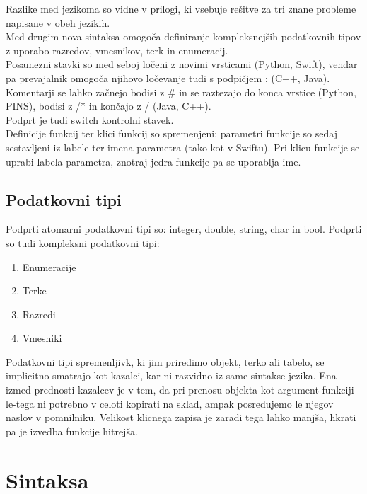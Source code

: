 \documentclass[a4paper, 12p]{book}
\begin{document}
\noindent Razlike med jezikoma so vidne v prilogi, ki vsebuje rešitve za tri znane probleme napisane v obeh jezikih. \\
\indent Med drugim nova sintaksa omogoča definiranje kompleksnejših podatkovnih tipov z uporabo razredov, vmesnikov, terk in enumeracij. \\
\indent Posamezni stavki so med seboj ločeni z novimi vrsticami (Python, Swift), vendar pa prevajalnik omogoča njihovo ločevanje tudi s podpičjem {\ttfamily ;} (C++, Java). \\
\indent Komentarji se lahko začnejo bodisi z {\ttfamily \#} in se raztezajo do konca vrstice (Python, PINS), bodisi z {\ttfamily /*} in končajo z {\ttfamily */} (Java, C++). \\
\indent Podprt je tudi {\ttfamily switch} kontrolni stavek. \\
\indent Definicije funkcij ter klici funkcij so spremenjeni; parametri funkcije so sedaj sestavljeni iz labele ter imena parametra (tako kot v Swiftu). Pri klicu funkcije se uprabi labela parametra, znotraj jedra funkcije pa se uporablja ime.

\subsection{Podatkovni tipi}

Podprti atomarni podatkovni tipi so: {\ttfamily integer, double, string, char} in {\ttfamily bool}. Podprti so tudi kompleksni podatkovni tipi:

\begin{enumerate}
	\item Enumeracije
	\item Terke
	\item Razredi
	\item Vmesniki
\end{enumerate} 

\indent Podatkovni tipi spremenljivk, ki jim priredimo objekt, terko ali tabelo, se implicitno smatrajo kot kazalci, kar ni razvidno iz same sintakse jezika. Ena izmed prednosti kazalcev je v tem, da pri prenosu objekta kot argument funkciji le-tega ni potrebno v celoti kopirati na sklad, ampak posredujemo le njegov naslov v pomnilniku. Velikost klicnega zapisa je zaradi tega lahko manjša, hkrati pa je izvedba funkcije hitrejša.

\section{Sintaksa}
\end{document}
